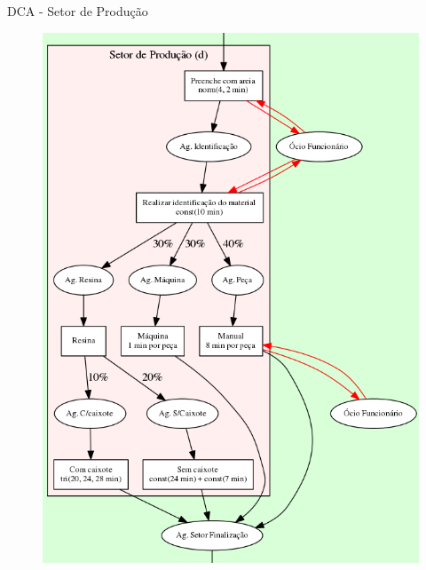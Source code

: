 \documentclass[xcolor=dvipsnames]{beamer}
\begin{document}
\begin{frame}{DCA - Setor de Produção}
	\begin{figure}[H]
		\centering
		\includegraphics[height=0.865\textheight]{img/d.png}
	\end{figure}
\end{frame}
	
\end{document}
